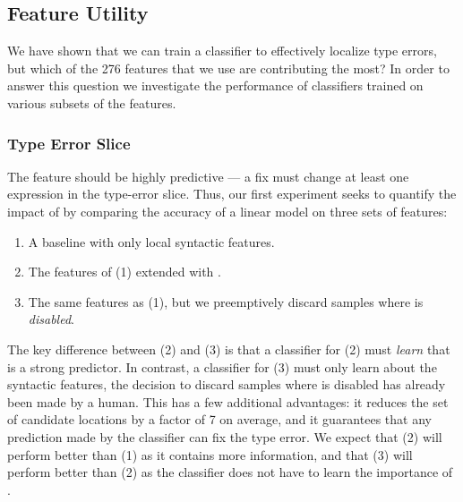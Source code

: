 \subsection{Feature Utility}
\label{sec:feature-utility}
We have shown that we can train a classifier to effectively localize
type errors, but which of the 276 features that we use are contributing
the most?
%
In order to answer this question we investigate the performance of
classifiers trained on various subsets of the features.

\subsubsection{Type Error Slice}
\label{sec:type-error-slice}
The \InSlice feature should be highly predictive --- a fix must change
at least one expression in the type-error slice.
%
Thus, our first experiment seeks to quantify the impact of \InSlice by
comparing the accuracy of a linear model on three sets of features:
%
\begin{enumerate}
\item A baseline with only local syntactic features.
\item The features of (1) extended with \InSlice.
\item The same features as (1), but we preemptively discard samples
  where \InSlice is \emph{disabled}.
\end{enumerate}
%
The key difference between (2) and (3) is that a classifier for (2) must
\emph{learn} that \InSlice is a strong predictor.
%
In contrast, a classifier for (3) must only learn about the syntactic
features, the decision to discard samples where \InSlice is disabled has
already been made by a human.
%
This has a few additional advantages: it reduces the set of candidate
locations by a factor of 7 on average, and it guarantees that any
prediction made by the classifier can fix the type error.
%
We expect that (2) will perform better than (1) as it contains more
information, and that (3) will perform better than (2) as the classifier
does not have to learn the importance of \InSlice.

